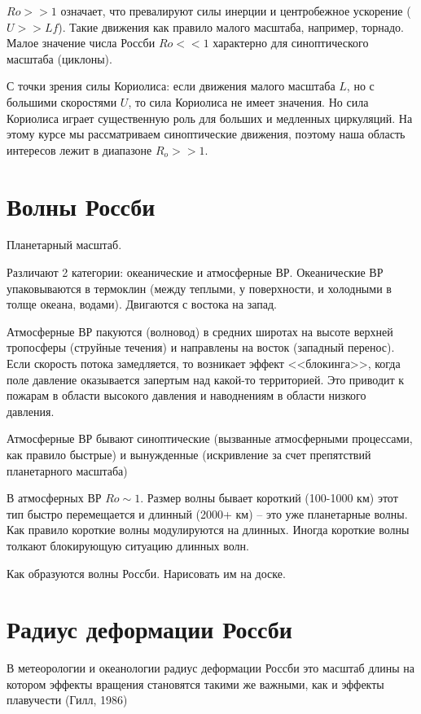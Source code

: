 $Ro >> 1$ означает, что превалируют силы инерции и центробежное ускорение ($U>>Lf$). Такие движения как правило малого масштаба, например, торнадо. Малое значение числа Россби $Ro << 1$ характерно для синоптического масштаба (циклоны).

С точки зрения силы Кориолиса: если движения малого масштаба $L$, но с большими скоростями $U$, то сила Кориолиса не имеет значения. Но сила Кориолиса играет существенную роль для больших и медленных циркуляций.  
На этому курсе мы рассматриваем синоптические движения, поэтому наша область интересов лежит в диапазоне $R_o >> 1$.

\section{Волны Россби} \label{A_Rossby}

Планетарный масштаб.

Различают 2 категории: океанические и атмосферные ВР. Океанические ВР упаковываются в термоклин (между теплыми, у поверхности, и холодными в толще океана, водами). Двигаются с востока на запад. 


Атмосферные ВР пакуются (волновод) в средних широтах на высоте верхней тропосферы (струйные течения) и направлены на восток (западный перенос). Если скорость потока замедляется, то возникает эффект <<блокинга>>, когда поле давление оказывается запертым над какой-то территорией. Это приводит к пожарам в области высокого давления и наводнениям в области низкого давления. 

Атмосферные ВР бывают синоптические (вызванные атмосферными процессами, как правило быстрые) и вынужденные (искривление за счет препятствий планетарного масштаба)

В атмосферных ВР $Ro \sim 1$. Размер волны бывает короткий (100-1000 км) этот тип быстро перемещается и длинный (2000+ км) -- это уже планетарные волны. Как правило короткие волны модулируются на длинных. Иногда короткие волны толкают блокирующую ситуацию длинных волн. 

Как образуются волны Россби. Нарисовать им на доске. 

\section{Радиус деформации Россби} \label{A_Rossby}
В метеорологии и океанологии радиус деформации Россби это масштаб длины на котором эффекты вращения становятся такими же важными, как и эффекты плавучести (Гилл, 1986)

